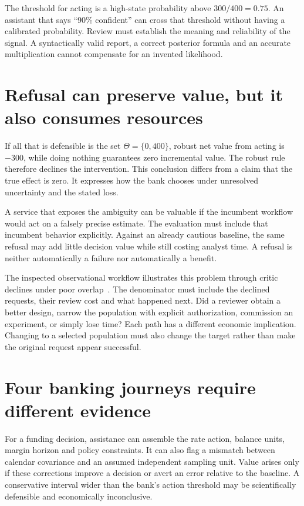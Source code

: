 The threshold for acting is a high-state probability above $300/400=0.75$.
An assistant that says ``90\% confident'' can cross that threshold without
having a calibrated probability. Review must establish the meaning and
reliability of the signal. A syntactically valid report, a correct posterior
formula and an accurate multiplication cannot compensate for an invented
likelihood.

\section{Refusal can preserve value, but it also consumes resources}

If all that is defensible is the set $\Theta=\{0,400\}$, robust net value from
acting is $-300$, while doing nothing guarantees zero incremental value.
The robust rule therefore declines the intervention. This conclusion differs
from a claim that the true effect is zero. It expresses how the bank chooses
under unresolved uncertainty and the stated loss.

A service that exposes the ambiguity can be valuable if the incumbent workflow
would act on a falsely precise estimate. The evaluation must include that
incumbent behavior explicitly. Against an already cautious baseline, the same
refusal may add little decision value while still costing analyst time. A
refusal is neither automatically a failure nor automatically a benefit.

The inspected observational workflow illustrates this problem through critic
declines under poor overlap~\citep{v12_la_2607_22443}. The denominator must include
the declined requests, their review cost and what happened next. Did a reviewer
obtain a better design, narrow the population with explicit authorization,
commission an experiment, or simply lose time? Each path has a different
economic implication. Changing to a selected population must also change the
target rather than make the original request appear successful.

\section{Four banking journeys require different evidence}

For a funding decision, assistance can assemble the rate action, balance units,
margin horizon and policy constraints. It can also flag a mismatch between
calendar covariance and an assumed independent sampling unit. Value arises
only if these corrections improve a decision or avert an error relative to the
baseline. A conservative interval wider than the bank's action threshold may
be scientifically defensible and economically inconclusive.

